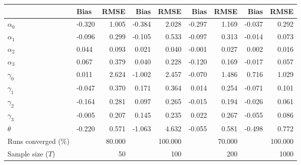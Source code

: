 
\begin{tabular}[t]{llrrrrrrr}
\toprule
  & Bias & RMSE & Bias & RMSE & Bias & RMSE & Bias & RMSE\\
\midrule
$\alpha_{0}$ & -0.320 & 1.005 & -0.384 & 2.028 & -0.297 & 1.169 & -0.037 & 0.292\\
$\alpha_{1}$ & -0.096 & 0.299 & -0.105 & 0.533 & -0.097 & 0.313 & -0.014 & 0.073\\
$\alpha_{2}$ & 0.044 & 0.093 & 0.021 & 0.040 & -0.001 & 0.027 & 0.002 & 0.016\\
$\alpha_{3}$ & 0.067 & 0.379 & 0.040 & 0.228 & -0.120 & 0.169 & -0.017 & 0.057\\
$\gamma_{0}$ & 0.011 & 2.624 & -1.002 & 2.457 & -0.070 & 1.486 & 0.716 & 1.029\\
$\gamma_{1}$ & -0.047 & 0.370 & 0.171 & 0.364 & 0.014 & 0.254 & -0.071 & 0.101\\
$\gamma_{2}$ & -0.164 & 0.281 & 0.097 & 0.265 & -0.015 & 0.194 & -0.026 & 0.061\\
$\gamma_{3}$ & -0.005 & 0.207 & 0.145 & 0.235 & 0.022 & 0.267 & -0.055 & 0.086\\
$\theta$ & -0.220 & 0.571 & -1.063 & 4.632 & -0.055 & 0.581 & -0.498 & 0.772\\
Runs converged (\%) &  & 80.000 &  & 100.000 &  & 70.000 &  & 100.000\\
Sample size ($T$) &  & 50 &  & 100 &  & 200 &  & 1000\\
\bottomrule
\end{tabular}
